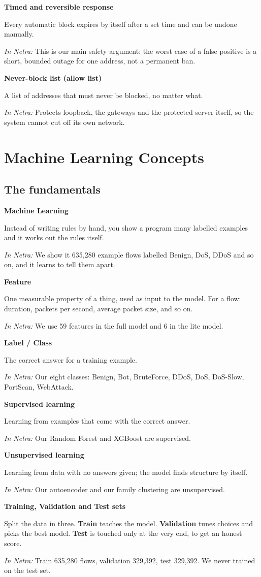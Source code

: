 \documentclass[11pt,a4paper]{article}
\newcommand{\term}[3]{%
  \par\medskip\noindent\textbf{\color{ink}#1}\par
  \nobreak\vspace{1pt}#2\par
  \nobreak\vspace{1pt}\textit{\color{accent}In Netra:} #3\par}
\begin{document}
\term{Timed and reversible response}
{Every automatic block expires by itself after a set time and can be undone
manually.}
{This is our main safety argument: the worst case of a false positive is a short,
bounded outage for one address, not a permanent ban.}

\term{Never-block list (allow list)}
{A list of addresses that must never be blocked, no matter what.}
{Protects loopback, the gateways and the protected server itself, so the system
cannot cut off its own network.}

\section{Machine Learning Concepts}

\subsection{The fundamentals}

\term{Machine Learning}
{Instead of writing rules by hand, you show a program many labelled examples and it
works out the rules itself.}
{We show it 635,280 example flows labelled Benign, DoS, DDoS and so on, and it
learns to tell them apart.}

\term{Feature}
{One measurable property of a thing, used as input to the model. For a flow:
duration, packets per second, average packet size, and so on.}
{We use 59 features in the full model and 6 in the lite model.}

\term{Label / Class}
{The correct answer for a training example.}
{Our eight classes: Benign, Bot, BruteForce, DDoS, DoS, DoS-Slow, PortScan,
WebAttack.}

\term{Supervised learning}
{Learning from examples that come with the correct answer.}
{Our Random Forest and XGBoost are supervised.}

\term{Unsupervised learning}
{Learning from data with no answers given; the model finds structure by itself.}
{Our autoencoder and our family clustering are unsupervised.}

\term{Training, Validation and Test sets}
{Split the data in three. \textbf{Train} teaches the model. \textbf{Validation}
tunes choices and picks the best model. \textbf{Test} is touched only at the very
end, to get an honest score.}
{Train 635,280 flows, validation 329,392, test 329,392. We never trained on the
test set.}
\end{document}
